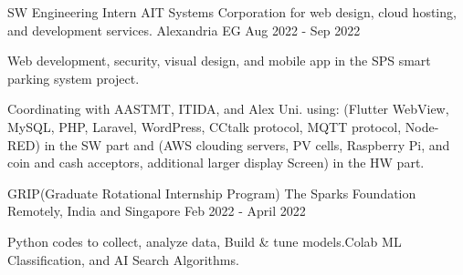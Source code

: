\begin{cventries}

    \cventry
      {SW Engineering Intern} %
      {AIT Systems Corporation for web design, cloud hosting, and development services.} %
      {Alexandria EG} %
      {Aug 2022 - Sep 2022} %
      {
        \begin{cvitems} %
          \item {Web development, security, visual design, and mobile app in the SPS smart parking system project.}
          \item {Coordinating with AASTMT, ITIDA, and Alex Uni. using: (Flutter WebView, MySQL, PHP, Laravel, WordPress, CCtalk protocol, MQTT protocol, Node-RED) in the SW part and (AWS clouding servers, PV cells, Raspberry Pi, and coin and cash acceptors, additional larger display Screen) in the HW part.}
    \end{cvitems}
      }
  
  \end{cventries}
\begin{cventries}

    \cventry
      {GRIP(Graduate Rotational Internship Program)} %
      {The Sparks Foundation} %
      {Remotely, India and Singapore} %
      {Feb 2022 - April 2022} %
      {
        \begin{cvitems} %
          \item {Python codes to collect, analyze data, Build \& tune models.Colab ML Classification, and AI Search Algorithms. }
    \end{cvitems}
      }
  
  \end{cventries}


